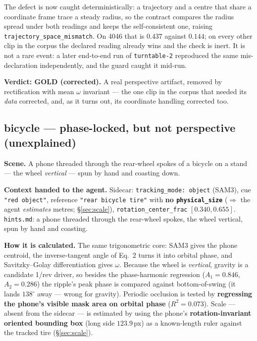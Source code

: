 \documentclass[11pt,a4paper]{article}
\begin{document}
The defect is now caught deterministically: a trajectory and a centre that share a coordinate frame
trace a steady radius, so the contract compares the radius spread under both readings and keeps the
self-consistent one, raising \texttt{trajectory\_space\_mismatch}. On 4046 that is $0.437$ against
$0.144$; on every other clip in the corpus the declared reading already wins and the check is inert.
It is not a rare event: a later end-to-end run of \texttt{turntable-2} reproduced the same
mis-declaration independently, and the guard caught it mid-run.

\textbf{Verdict: GOLD (corrected).} A real perspective artifact, removed by rectification with mean
$\omega$ invariant --- the one clip in the corpus that needed its \emph{data} corrected, and, as it
turns out, its coordinate handling corrected too.

\subsection{bicycle --- phase-locked, but not perspective (unexplained)}

\textbf{Scene.} A phone threaded through the rear-wheel spokes of a bicycle on a stand --- the wheel
\emph{vertical} --- spun by hand and coasting down.

\textbf{Context handed to the agent.} Sidecar: \texttt{tracking\_mode: object} (SAM3), cue
\texttt{"red object"}, reference \texttt{"rear bicycle tire"} with \textbf{no
\texttt{physical\_size}} ($\Rightarrow$ the agent \emph{estimates} metres; \S\ref{sec:scale}),
\texttt{rotation\_center\_frac} $[0.340,0.655]$. \texttt{hints.md}: a phone threaded through the
rear-wheel spokes, the wheel vertical, spun by hand and coasting.

\textbf{How it is calculated.} The same trigonometric core: SAM3 gives the phone centroid, the
inverse-tangent angle of Eq.~2 turns it into orbital phase, and Savitzky--Golay differentiation gives
$\omega$. Because the wheel is \emph{vertical}, gravity is a candidate 1/rev driver, so besides the
phase-harmonic regression ($A_1{=}0.846$, $A_2{=}0.286$) the ripple's peak phase is compared against
bottom-of-swing (it lands $138^\circ$ away --- wrong for gravity). Periodic occlusion is tested by
\textbf{regressing the phone's visible mask area on orbital phase} ($R^2{=}0.073$). Scale --- absent
from the sidecar --- is estimated by using the phone's \textbf{rotation-invariant oriented bounding
box} (long side $123.9$\,px) as a known-length ruler against the tracked tire (\S\ref{sec:scale}).
\end{document}
